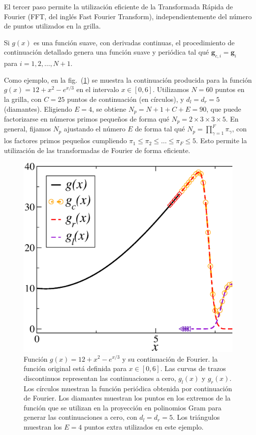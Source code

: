 El tercer paso permite la utilización eficiente de la Transformada Rápida de Fourier
(FFT, del inglés Fast Fourier Transform), independientemente del número de puntos 
utilizados en la grilla.  

Si $g(x)$ es una función suave, con derivadas continuas, el 
procedimiento de continuación detallado genera una función suave 
y periódica tal qué $\mathbf{g}_{c,i}=\mathbf{g}_i$ para $i=1,2,\ldots,N+1$.

Como ejemplo, en la fig.~(\ref{fig:Continuedg}) se muestra la continuación 
producida para la función $g(x)=12+x^2 - e^{x/3}$ en el intervalo $x\in [0,6]$.
Utilizamos $N=60$ puntos en la grilla, con $C=25$ puntos de continuación (en círculos), 
y $d_l=d_r=5$ (diamantes). Eligiendo $E=4$, se obtiene  $N_p = N + 1 + C + E=90$, 
que puede factorizarse en números primos pequeños 
de forma qué $N_p=2\times 3 \times 3 \times 5$. 
En general, fijamos $N_p$ ajustando el número $E$ de forma tal 
qué $N_p=\prod_{\gamma=1}^{F} \pi_{\gamma}$, con los factores 
primos pequeños cumpliendo $\pi_1\leq\pi_2\leq \ldots \leq \pi_{F} \leq 5$. 
Esto permite la utilización de las transformadas de Fourier 
de forma eficiente.

\begin{figure}[h!]
\centering
  \includegraphics[width=0.5\linewidth]{figuras/continued.eps}
  \caption{Función $g(x)=12+x^2 - e^{x/3}$ y su continuación de Fourier. 
  la función original está definida para $x\in[0,6]$. Las curvas 
  de trazos discontinuos representan las continuaciones a cero, $g_l(x)$ y $g_r(x)$.
  Los círculos muestran la función periódica obtenida por continuación de Fourier. 
  Los diamantes muestran los puntos en los extremos de la función 
  que se utilizan en la proyección en polinomios Gram para generar las continuaciones 
  a cero, con $d_l=d_r=5$. Los triángulos muestran los $E=4$ puntos 
  extra utilizados en este ejemplo.}
 \label{fig:Continuedg}
\end{figure}

